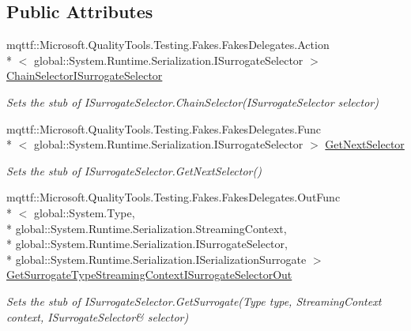 \subsection*{Public Attributes}
\begin{DoxyCompactItemize}
\item 
mqttf\-::\-Microsoft.\-Quality\-Tools.\-Testing.\-Fakes.\-Fakes\-Delegates.\-Action\\*
$<$ global\-::\-System.\-Runtime.\-Serialization.\-I\-Surrogate\-Selector $>$ \hyperlink{class_system_1_1_runtime_1_1_serialization_1_1_fakes_1_1_stub_i_surrogate_selector_a764c623dafad1b4f337daacbc10bb5c5}{Chain\-Selector\-I\-Surrogate\-Selector}
\begin{DoxyCompactList}\small\item\em Sets the stub of I\-Surrogate\-Selector.\-Chain\-Selector(\-I\-Surrogate\-Selector selector)\end{DoxyCompactList}\item 
mqttf\-::\-Microsoft.\-Quality\-Tools.\-Testing.\-Fakes.\-Fakes\-Delegates.\-Func\\*
$<$ global\-::\-System.\-Runtime.\-Serialization.\-I\-Surrogate\-Selector $>$ \hyperlink{class_system_1_1_runtime_1_1_serialization_1_1_fakes_1_1_stub_i_surrogate_selector_ae5ba6bbb406ff919d6a94d8496635c60}{Get\-Next\-Selector}
\begin{DoxyCompactList}\small\item\em Sets the stub of I\-Surrogate\-Selector.\-Get\-Next\-Selector()\end{DoxyCompactList}\item 
mqttf\-::\-Microsoft.\-Quality\-Tools.\-Testing.\-Fakes.\-Fakes\-Delegates.\-Out\-Func\\*
$<$ global\-::\-System.\-Type, \\*
global\-::\-System.\-Runtime.\-Serialization.\-Streaming\-Context, \\*
global\-::\-System.\-Runtime.\-Serialization.\-I\-Surrogate\-Selector, \\*
global\-::\-System.\-Runtime.\-Serialization.\-I\-Serialization\-Surrogate $>$ \hyperlink{class_system_1_1_runtime_1_1_serialization_1_1_fakes_1_1_stub_i_surrogate_selector_a959c7aafb0e0b05558596f416ab3969b}{Get\-Surrogate\-Type\-Streaming\-Context\-I\-Surrogate\-Selector\-Out}
\begin{DoxyCompactList}\small\item\em Sets the stub of I\-Surrogate\-Selector.\-Get\-Surrogate(Type type, Streaming\-Context context, I\-Surrogate\-Selector\& selector)\end{DoxyCompactList}\end{DoxyCompactItemize}


